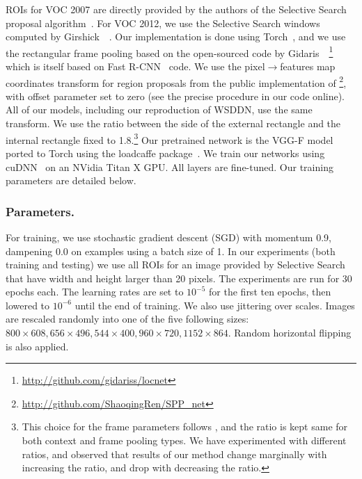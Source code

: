 \documentclass[runningheads]{llncs}
\begin{document}
ROIs for VOC 2007 are directly provided by the authors of the Selective
Search proposal algorithm~\cite{uijlings2013selective}. For VOC 2012, we use the Selective Search windows computed by Girshick~\etal~\cite{Girshick_2015_ICCV}.
Our implementation is done using Torch~\cite{collobert2011torch7}, and we use the
rectangular frame pooling based on the open-sourced code by Gidaris~\etal~\cite{DBLP:journals/corr/GidarisK15a,Gidaris_2015_ICCV}\footnote{\url{http://github.com/gidariss/locnet}} which 
is itself based on Fast R-CNN~\cite{Girshick_2015_ICCV} code.  
We use the pixel$\rightarrow$features map coordinates transform for 
region proposals from the public implementation of \cite{He:2014wg}\footnote{\url{http://github.com/ShaoqingRen/SPP_net}}, 
with offset parameter set to zero (see the precise procedure in our code online\footnotemark[1]).
All of our models, including our reproduction of WSDDN, use the same transform. 
We use the  ratio between the side of the external rectangle and the internal rectangle fixed to 1.8.\footnote{This choice for the frame parameters follows \cite{DBLP:journals/corr/GidarisK15a,Gidaris_2015_ICCV}, and the ratio is kept same for both context and frame pooling types. We have experimented with different ratios, and observed that results of our method change marginally with increasing the ratio, and drop with decreasing  the ratio.}
Our pretrained network is the VGG-F model~\cite{Chatfield14} ported to Torch using the loadcaffe
package~\cite{zagoruyko2015}.
We train our networks using cuDNN~\cite{chetlur2014cudnn} on an NVidia Titan
X GPU. All layers are fine-tuned. Our training parameters are detailed below.

\subsubsection{Parameters.}%
For training, we use stochastic gradient descent (SGD) with momentum 0.9, dampening 0.0 on
examples using a batch size of 1. In our experiments (both training and testing) 
we use all ROIs for an image provided by Selective Search~\cite{uijlings2013selective} that have width and height larger than 20 pixels.
The experiments are run for 30 epochs each. The learning rates are set to
$10^{-5}$ for the first ten epochs, then lowered to $10^{-6}$
until the end of training.
We also use jittering over scales. Images are rescaled randomly into one of the
five following sizes: $800\times 608, 656\times 496, 544\times 400, 960\times
720, 1152\times 864$. Random horizontal flipping is also applied. 
\end{document}
